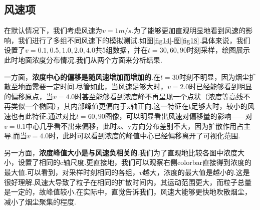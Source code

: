 \documentclass{article}
\begin{document}
	\subsection{风速项}
	在默认情况下，我们考虑风速为$v=1m/s$.为了能够更加直观明显地看到风速的影响，我们进行了多组不同风速下的模拟测试.如图\ref{fig14}-图\ref{fig18}.具体来说，我们设置了$v=0.1,0.5,1.0,2.0,4.0$共5组数据，并在$t=30,60,90$时刻采样，绘图展示此时地面浓度分布情况.我们从两个方面来分析结果.
	\par 一方面，\textbf{浓度中心的偏移是随风速增加而增加的}.在$t=30$时刻不明显，因为烟尘扩散至地面需要一定时间.尽管如此，当风速足够大时，$v=2.0$时已经能够看到明显的偏移原点，当$v=4.0$时甚至能够看到浓度峰不再呈现一个点状（浓度等高线不再类似一个椭圆），其内部峰值更偏向于x轴正向.这一特征在t足够大时，较小的风速也有此特征.通过对比$t=60,90$图像，可以明显看出风速对偏移量的影响——对$v=0.1$中心几乎看不出来偏移，此时x、y方向分布差别不大，因为扩散作用占主导.而当$v=4.0$时，此时可以看到浓度的峰值中心已经偏移离开了可视化范围.
	\par 另一方面，\textbf{浓度峰值大小是与风速负相关的}.我们为了直观地比较各图中浓度大小，设置了相同的c轴尺度.更直接地，我们可以观察右侧colorbar直接得到浓度的最大值.可以看到，对采样时刻相同的各组，$v$越大，浓度的最大值是越小的.这是很好理解.风速大导致了粒子在相同的扩散时间内，其运动范围更大，而粒子总量是一定的，故峰值较小.在实际中，直觉告诉我们，风速大能够更快地吹散烟尘，减小了烟尘聚集的程度.
	
\end{document}
